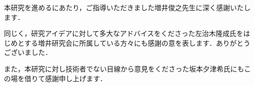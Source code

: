 \begin{acknowledgment}

本研究を進めるにあたり，ご指導いただきました増井俊之先生に深く感謝いたします．

同じく，研究アイデアに対して多大なアドバイスをくださった左治木隆成氏をはじめとする増井研究会に所属している方々にも感謝の意を表します．ありがとうございました．

また，本研究に対し技術者でない目線から意見をくださった坂本夕津希氏にもこの場を借りて感謝申し上げます．

\end{acknowledgment}
